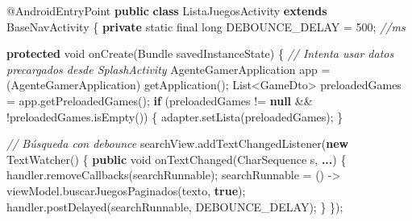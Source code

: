 \documentclass[
  spanish,
  11pt,
  paper=a4,
  ,captions=tableheading
]{scrartcl}
\newenvironment{Shaded}{}{}
\newcommand{\AttributeTok}[1]{\textcolor[rgb]{0.49,0.56,0.16}{#1}}
\newcommand{\BuiltInTok}[1]{\textcolor[rgb]{0.00,0.50,0.00}{#1}}
\newcommand{\CommentTok}[1]{\textcolor[rgb]{0.38,0.63,0.69}{\textit{#1}}}
\newcommand{\ControlFlowTok}[1]{\textcolor[rgb]{0.00,0.44,0.13}{\textbf{#1}}}
\newcommand{\DataTypeTok}[1]{\textcolor[rgb]{0.56,0.13,0.00}{#1}}
\newcommand{\DecValTok}[1]{\textcolor[rgb]{0.25,0.63,0.44}{#1}}
\newcommand{\FunctionTok}[1]{\textcolor[rgb]{0.02,0.16,0.49}{#1}}
\newcommand{\KeywordTok}[1]{\textcolor[rgb]{0.00,0.44,0.13}{\textbf{#1}}}
\newcommand{\NormalTok}[1]{#1}
\newcommand{\OperatorTok}[1]{\textcolor[rgb]{0.40,0.40,0.40}{#1}}
\begin{document}
\begin{Shaded}
\begin{Highlighting}[]
\AttributeTok{@AndroidEntryPoint}
\KeywordTok{public} \KeywordTok{class}\NormalTok{ ListaJuegosActivity }\KeywordTok{extends}\NormalTok{ BaseNavActivity }\OperatorTok{\{}
    \KeywordTok{private} \DataTypeTok{static} \DataTypeTok{final} \DataTypeTok{long}\NormalTok{ DEBOUNCE\_DELAY }\OperatorTok{=} \DecValTok{500}\OperatorTok{;} \CommentTok{//ms}

    \KeywordTok{protected} \DataTypeTok{void} \FunctionTok{onCreate}\OperatorTok{(}\NormalTok{Bundle savedInstanceState}\OperatorTok{)} \OperatorTok{\{}
        \CommentTok{// Intenta usar datos precargados desde SplashActivity}
\NormalTok{        AgenteGamerApplication app }\OperatorTok{=} \OperatorTok{(}\NormalTok{AgenteGamerApplication}\OperatorTok{)} \FunctionTok{getApplication}\OperatorTok{();}
        \BuiltInTok{List}\OperatorTok{\textless{}}\NormalTok{GameDto}\OperatorTok{\textgreater{}}\NormalTok{ preloadedGames }\OperatorTok{=}\NormalTok{ app}\OperatorTok{.}\FunctionTok{getPreloadedGames}\OperatorTok{();}
        \ControlFlowTok{if} \OperatorTok{(}\NormalTok{preloadedGames }\OperatorTok{!=} \KeywordTok{null} \OperatorTok{\&\&} \OperatorTok{!}\NormalTok{preloadedGames}\OperatorTok{.}\FunctionTok{isEmpty}\OperatorTok{())} \OperatorTok{\{}
\NormalTok{            adapter}\OperatorTok{.}\FunctionTok{setLista}\OperatorTok{(}\NormalTok{preloadedGames}\OperatorTok{);}
        \OperatorTok{\}}

        \CommentTok{// Búsqueda con debounce}
\NormalTok{        searchView}\OperatorTok{.}\FunctionTok{addTextChangedListener}\OperatorTok{(}\KeywordTok{new} \FunctionTok{TextWatcher}\OperatorTok{()} \OperatorTok{\{}
            \KeywordTok{public} \DataTypeTok{void} \FunctionTok{onTextChanged}\OperatorTok{(}\BuiltInTok{CharSequence}\NormalTok{ s}\OperatorTok{,} \KeywordTok{...}\OperatorTok{)} \OperatorTok{\{}
\NormalTok{                handler}\OperatorTok{.}\FunctionTok{removeCallbacks}\OperatorTok{(}\NormalTok{searchRunnable}\OperatorTok{);}
\NormalTok{                searchRunnable }\OperatorTok{=} \OperatorTok{()} \OperatorTok{{-}\textgreater{}}\NormalTok{ viewModel}\OperatorTok{.}\FunctionTok{buscarJuegosPaginados}\OperatorTok{(}\NormalTok{texto}\OperatorTok{,} \KeywordTok{true}\OperatorTok{);}
\NormalTok{                handler}\OperatorTok{.}\FunctionTok{postDelayed}\OperatorTok{(}\NormalTok{searchRunnable}\OperatorTok{,}\NormalTok{ DEBOUNCE\_DELAY}\OperatorTok{);}
            \OperatorTok{\}}
        \OperatorTok{\});}


\end{Highlighting}
\end{Shaded}
\end{document}
